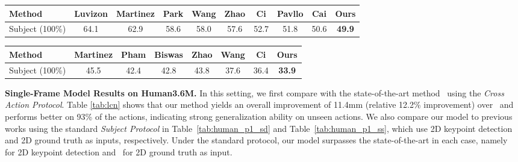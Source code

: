 \documentclass[runningheads]{llncs}
\begin{document}
\begin{table*}
\begin{center}
\resizebox{\textwidth}{4mm}
{
\begin{tabular}{ l |c| c| c| c |c |c |c |c |c}
\hline
Method &Luvizon\cite{luvizon20182d}&Martinez\cite{martinez2017simple}&Park\cite{park20183d}&Wang \cite{wang2019generalizing}&Zhao\cite{zhao2019semantic}&Ci\cite{ci2019optimizing}&Pavllo \cite{pavllo20193d} &Cai\cite{cai2019exploiting}&Ours\\
\hline
Subject (100\%) &64.1&62.9&58.6&58.0&57.6&52.7&51.8&50.6&\textbf{49.9}\\
\hline
\end{tabular}}
\end{center}
\caption{Comparison on \emph{single-frame 2D pose detection input} in terms of mean per-joint position error (MPJPE). Best result in bold. }
\label{tab:human_p1_sd}
\end{table*}

\begin{table*}
\begin{center}
\scriptsize
{
\begin{tabular}{ l| c |c |c |c |c |c|c }
\hline
Method &Martinez \cite{martinez2017simple}&Pham \cite{pham2019unified}&Biswas\cite{biswas2019lifting} &Zhao \cite{zhao2019semantic}&Wang \cite{wang2019generalizing} &Ci \cite{ci2019optimizing} &Ours \\
\hline
Subject (100\%) &45.5&42.4&42.8&43.8&37.6&36.4&\textbf{33.9}\\
\hline
\end{tabular}}
\end{center}
\caption{Comparison on \emph{single-frame 2D ground truth pose input} in terms of MPJPE. With ground truth 2D pose as input, the upper bound of these methods is explored. 
}
\label{tab:human_p1_ss}
\end{table*}



\noindent\textbf{Single-Frame Model Results on Human3.6M.} In this setting, 
we first compare with the state-of-the-art method~\cite{ci2019optimizing} using the \emph{Cross Action Protocol}. Table \ref{tab:lcn} shows that our method yields an overall improvement of 11.4mm (relative 12.2\% improvement) over~\cite{ci2019optimizing} and performs better on 93\% of the actions, indicating strong generalization ability on unseen actions. We also compare our model to previous works using the standard \emph{Subject Protocol} in Table~\ref{tab:human_p1_sd} and Table~\ref{tab:human_p1_ss}, which use 2D keypoint detection and 2D ground truth as inputs, respectively. 
Under the standard protocol, our model surpasses the state-of-the-art in each case, namely~\cite{cai2019exploiting} for 2D keypoint detection and~\cite{ci2019optimizing} for 2D ground truth as input.
\end{document}
